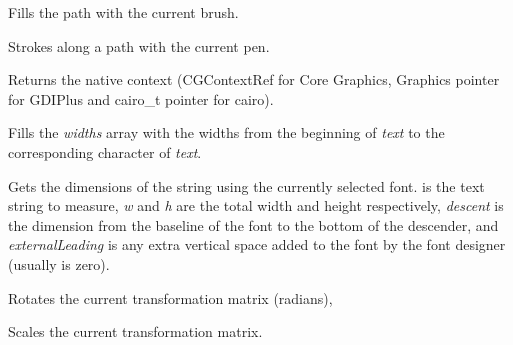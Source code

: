Fills the path with the current brush.

\label{wxgraphicscontextstrokepath}


Strokes along a path with the current pen.


\label{wxgraphicscontextgetnativecontext}


Returns the native context (CGContextRef for Core Graphics, Graphics pointer for GDIPlus and cairo\_t pointer for cairo).

\label{wxgraphicscontextgetpartialtextextents}


Fills the {\it widths} array with the widths from the beginning of 
{\it text} to the corresponding character of {\it text}.  

\label{wxgraphicscontextgettextextent}


Gets the dimensions of the string using the currently selected font.
 is the text string to measure, {\it w} and {\it h} are
the total width and height respectively, {\it descent} is the
dimension from the baseline of the font to the bottom of the
descender, and {\it externalLeading} is any extra vertical space added
to the font by the font designer (usually is zero).

\label{wxgraphicscontextrotate}


Rotates the current transformation matrix (radians),

\label{wxgraphicscontextscale}


Scales the current transformation matrix.

